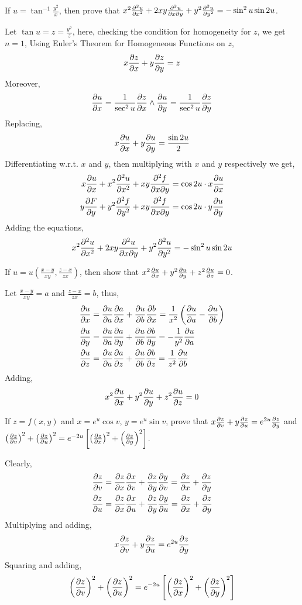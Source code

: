 \begin{asign}
	If $u=\tan^{-1}\frac{y^2}{x}$, then prove that $x^2\pdv[2]{u}{x}+2xy\pdv{u}{x}{y}+y^2\pdv[2]{u}{y}=-\sin^2u\sin2u$.
\end{asign}
\begin{anse}
	Let $\tan u=z=\frac{y^2}{z}$, here, checking the condition for homogeneity for $z$, we get $n=1$,
	Using Euler's Theorem for Homogeneous Functions on $z$,
	\[x\pdv{z}{x}+y\pdv{z}{y}=z\]
	Moreover,
	\[\pdv{u}{x}=\frac{1}{\sec^2u}\pdv{z}{x} \land \pdv{u}{y}=\frac{1}{\sec^2u}\pdv{z}{y} \]
	Replacing,
	\[x\pdv{u}{x}+y\pdv{u}{y}=\frac{\sin2u}{2}\]
	Differentiating w.r.t. $x$ and $y$, then multiplying with $x$ and $y$ respectively we get,
	\[\begin{split}
		x\pdv{u}{x}+x^2\pdv[2]{u}{x}+xy\pdv{f}{x}{y}&=\cos2u\cdot x\pdv{u}{x}\\
		y\pdv{F}{y}+y^2\pdv[2]{f}{y}+xy\pdv{f}{x}{y}&=\cos2u \cdot y\pdv{u}{y}\\
	\end{split}\]
	Adding the equations,
	\[x^2\pdv[2]{u}{x}+2xy\pdv{u}{x}{y}+y^2\pdv[2]{u}{y}=-\sin^2u\sin2u\]
\end{anse}
\begin{asign}
	If $u=u\left(\frac{x-y}{xy},\frac{z-x}{zx}\right)$, then show that $x^2\pdv{u}{x}+y^2\pdv{u}{y}+z^2\pdv{u}{z}=0$.
\end{asign}
\begin{anse}
	Let $\frac{x-y}{xy}=a$ and $\frac{z-x}{zx}=b$, thus,
	\[\begin{split}
		\pdv{u}{x}&=\pdv{u}{a}\pdv{a}{x}+\pdv{u}{b}\pdv{b}{x}=\frac{1}{x^2}\left(\pdv{u}{a}-\pdv{u}{b}\right)\\
		\pdv{u}{y}&=\pdv{u}{a}\pdv{a}{y}+\pdv{u}{b}\pdv{b}{y}=-\frac{1}{y^2}\pdv{u}{a}\\
		\pdv{u}{z}&=\pdv{u}{a}\pdv{a}{z}+\pdv{u}{b}\pdv{b}{z}=\frac{1}{z^2}\pdv{u}{b}
	\end{split}\]
	Adding,
	\[x^2\pdv{u}{x}+y^2\pdv{u}{y}+z^2\pdv{u}{z}=0\]
\end{anse}
\begin{asign}
	If $z=f(x,y)$ and $x=e^u\cos v$, $y=e^u\sin v$, prove that $x\pdv{z}{v}+y\pdv{z}{u}=e^{2u}\pdv{z}{y}$ and $\left(\pdv{z}{v}\right)^2+\left(\pdv{z}{u}\right)^2= e^{-2u}\left[ \left(\pdv{z}{x}\right)^2 + \left(\pdv{z}{y}\right)^2\right]$.
\end{asign}
\begin{anse}
	Clearly,
	\[\begin{split}
		\pdv{z}{v}&=\pdv{z}{x}\pdv{x}{v}+\pdv{z}{y}\pdv{y}{v}=\pdv{z}{x}(-e^u\sin v)+\pdv{z}{y}(e^u\cos v)  \\
		\pdv{z}{u}&=\pdv{z}{x}\pdv{x}{u}+\pdv{z}{y}\pdv{y}{u}=\pdv{z}{x}(e^u\cos v)+\pdv{z}{y}(e^u\sin v)
	\end{split}\]
	Multiplying and adding,
	\[x\pdv{z}{v}+y\pdv{z}{u}=e^{2u}\pdv{z}{y}\]
	Squaring and adding,
	\[\left(\pdv{z}{v}\right)^2+\left(\pdv{z}{u}\right)^2= e^{-2u}\left[ \left(\pdv{z}{x}\right)^2 + \left(\pdv{z}{y}\right)^2\right] \]
\end{anse}
